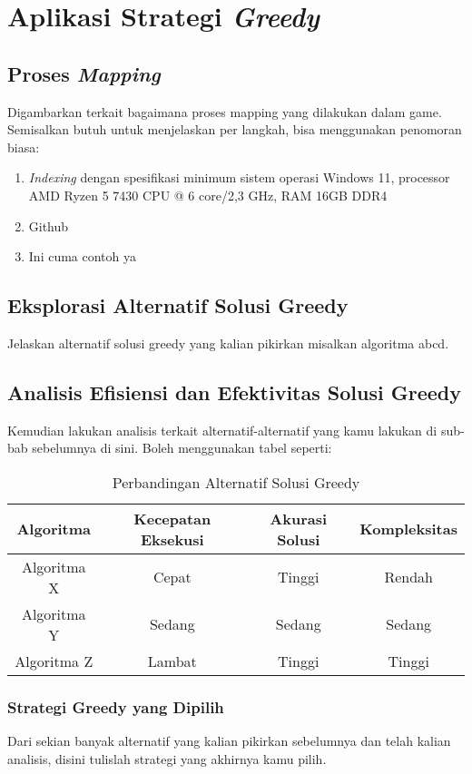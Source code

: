 \newpage
\chapter{Aplikasi Strategi \textit{Greedy}} \label{Bab III}

\section{Proses \textit{Mapping}} \label{III.Mapping}
Digambarkan terkait bagaimana proses mapping yang dilakukan dalam game. Semisalkan butuh untuk menjelaskan per langkah, bisa menggunakan penomoran biasa:\par
\begin{enumerate}[noitemsep]
    \item \textit{Indexing} dengan spesifikasi minimum sistem operasi Windows 11, processor AMD Ryzen 5 7430 CPU @ 6 core/2,3 GHz, RAM 16GB DDR4
    \item Github
    \item Ini cuma contoh ya
\end{enumerate}

\section{Eksplorasi Alternatif Solusi Greedy} \label{III.EksplorAlternatif}
Jelaskan alternatif solusi greedy yang kalian pikirkan misalkan algoritma abcd. \par

\section{Analisis Efisiensi dan Efektivitas Solusi Greedy} \label{III.AnalisisEfisiensi}
Kemudian lakukan analisis terkait alternatif-alternatif yang kamu lakukan di sub-bab sebelumnya di sini. Boleh menggunakan tabel seperti:
\par

\begin{table}[H]
\renewcommand{\arraystretch}{1.5} %
\centering
\caption{Perbandingan Alternatif Solusi Greedy}
\begin{tabular}{|c|c|c|c|}
\hline
\textbf{Algoritma} & \textbf{Kecepatan Eksekusi} & \textbf{Akurasi Solusi} & \textbf{Kompleksitas} \\ \hline
Algoritma X        & Cepat                        & Tinggi                   & Rendah                \\ \hline
Algoritma Y        & Sedang                       & Sedang                   & Sedang                \\ \hline
Algoritma Z        & Lambat                       & Tinggi                   & Tinggi                \\ \hline
\end{tabular}
\label{tab:perbandingan_greedy}
\end{table}

\subsection{Strategi Greedy yang Dipilih} \label{III.Strategi Dipilih}
Dari sekian banyak alternatif yang kalian pikirkan sebelumnya dan telah kalian analisis, disini tulislah strategi yang akhirnya kamu pilih. \par
